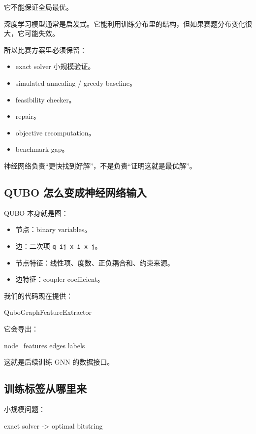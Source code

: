 \documentclass[UTF8,12pt,a4paper]{ctexart}
\begin{document}
它不能保证全局最优。

深度学习模型通常是启发式。它能利用训练分布里的结构，但如果赛题分布变化很大，它可能失效。

所以比赛方案里必须保留：

\begin{itemize}
\item exact solver 小规模验证。
\item simulated annealing / greedy baseline。
\item feasibility checker。
\item repair。
\item objective recomputation。
\item benchmark gap。
\end{itemize}

神经网络负责“更快找到好解”，不是负责“证明这就是最优解”。

\subsection*{QUBO 怎么变成神经网络输入}

QUBO 本身就是图：

\begin{itemize}
\item 节点：binary variables。
\item 边：二次项 \texttt{q\_ij x\_i x\_j}。
\item 节点特征：线性项、度数、正负耦合和、约束来源。
\item 边特征：coupler coefficient。
\end{itemize}

我们的代码现在提供：

\begin{GuideVerbatim}
QuboGraphFeatureExtractor
\end{GuideVerbatim}

它会导出：

\begin{GuideVerbatim}
node_features
edges
labels
\end{GuideVerbatim}

这就是后续训练 GNN 的数据接口。

\subsection*{训练标签从哪里来}

小规模问题：

\begin{GuideVerbatim}
exact solver -> optimal bitstring
\end{GuideVerbatim}
\end{document}
